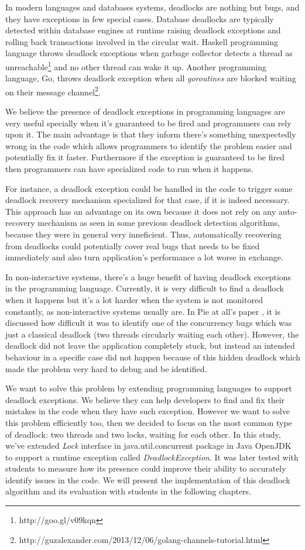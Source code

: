 In modern languages and databases systems, deadlocks are nothing but bugs, and they have exceptions in few special cases.
Database deadlocks are typically detected within database engines at runtime \cite{grechanik} raising deadlock exceptions and rolling back transactions
involved in the circular wait. Haskell programming language throws deadlock exceptions when garbage collector detects a thread as unreachable\footnote{http://goo.gl/v09kqn}
and no other thread can wake it up. Another programming language, Go, throws deadlock exception when all \emph{goroutines} are blocked waiting on their message channel\footnote{http://guzalexander.com/2013/12/06/golang-channels-tutorial.html}.

We believe the presence of deadlock exceptions in programming languages are very useful specially when it's guaranteed to be fired and programmers can rely upon it.
The main advantage is that they inform there's something unexpectedly wrong in the code which allows programmers to identify the problem easier and potentially fix it faster.
Furthermore if the exception is guaranteed to be fired then programmers can have specialized code to run when it happens.

For instance, a deadlock exception could be handled in the code to trigger some deadlock recovery mechanism specialized for that case, if it is indeed necessary.
This approach has an advantage on its own because it does not rely on any auto-recovery mechanism as seen in some previous deadlock detection algorithms,
because they were in general very inneficient. Thus, automatically recovering from deadlocks could potentially cover real bugs that needs to be fixed immediately
and also turn application's performance a lot worse in exchange.

In non-interactive systems, there's a huge benefit of having deadlock exceptions in the programming language.
Currently, it is very difficult to find a deadlock when it happens but it's a lot harder when the system is not monitored constantly, as non-interactive systems usually are.
In Pie at all's paper \cite{ian}, it is discussed how difficult it was to identify one of the concurrency bugs which was just a classical deadlock (two threads circularly waiting each other). However, the deadlock did not leave the application completely stuck, but instead an intended behaviour in a specific case did not happen because of this hidden deadlock
which made the problem very hard to debug and be identified.

We want to solve this problem by extending programming languages to support deadlock exceptions. We believe they can help developers to find and fix their mistakes
in the code when they have such exception. However we want to solve this problem efficiently too, then we decided to focus on the most common type of deadlock:
two threads and two locks, waiting for each other. In this study, we've extended \emph{Lock} interface in java.util.concurrent package in Java OpenJDK to support
a runtime exception called \emph{DeadlockException}. It was later tested with students to measure how its presence could improve their ability to accurately identify issues in the code.
We will present the implementation of this deadlock algorithm and its evaluation with students in the following chapters.
